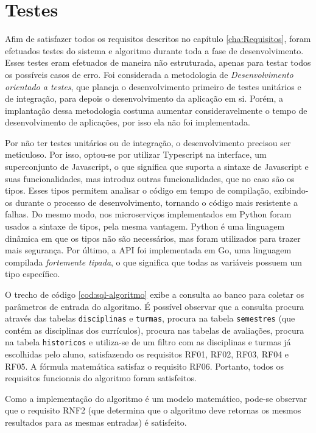 \chapter{Testes}
\label{cha:Testes}

Afim de satisfazer todos os requisitos descritos no capítulo \ref{cha:Requisitos}, foram efetuados testes do sistema e algoritmo durante toda a fase de desenvolvimento. Esses testes eram efetuados de maneira não estruturada, apenas para testar todos os possíveis casos de erro. Foi considerada a metodologia de \textit{Desenvolvimento orientado a testes}, que planeja o desenvolvimento primeiro de testes unitários e de integração, para depois o desenvolvimento da aplicação em si. Porém, a implantação dessa metodologia costuma aumentar consideravelmente o tempo de desenvolvimento de aplicações, por isso ela não foi implementada.

Por não ter testes unitários ou de integração, o desenvolvimento precisou ser meticuloso. Por isso, optou-se por utilizar Typescript na interface, um superconjunto de Javascript, o que significa que suporta a sintaxe de Javascript e suas funcionalidades, mas introduz outras funcionalidades, que no caso são os tipos. Esses tipos permitem analisar o código em tempo de compilação, exibindo-os durante o processo de desenvolvimento, tornando o código mais resistente a falhas. Do mesmo modo, nos microserviços implementados em Python foram usados a sintaxe de tipos, pela mesma vantagem. Python é uma linguagem dinâmica em que os tipos não são necessários, mas foram utilizados para trazer mais segurança. Por último, a API foi implementada em Go, uma linguagem compilada \textit{fortemente tipada}, o que significa que todas as variáveis possuem um tipo específico.

O trecho de código \ref{cod:sql-algoritmo} exibe a consulta ao banco para coletar os parâmetros de entrada do algoritmo. É possível observar que a consulta procura através das tabelas \verb|disciplinas| e \verb|turmas|, procura na tabela \verb|semestres| (que contém as disciplinas dos currículos), procura nas tabelas de avaliações, procura na tabela \verb|historicos| e utiliza-se de um filtro com as disciplinas e turmas já escolhidas pelo aluno, satisfazendo os requisitos RF01, RF02, RF03, RF04 e RF05. A fórmula matemática satisfaz o requisito RF06. Portanto, todos os requisitos funcionais do algoritmo foram satisfeitos. 

Como a implementação do algoritmo é um modelo matemático, pode-se observar que o requisito RNF2 (que determina que o algoritmo deve retornas os mesmos resultados para as mesmas entradas) é satisfeito. 

